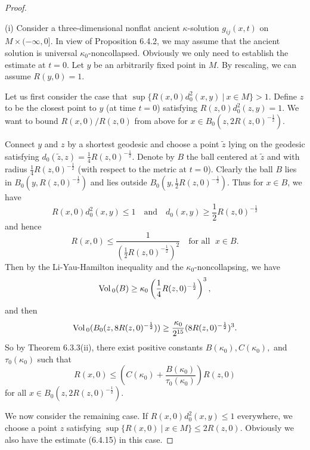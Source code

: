 \begin{proof}
   \

(i) Consider a three-dimensional nonflat ancient $\kappa$-solution
$g_{ij}(x,t)$ on $M \times (-\infty,0]$. In view of Proposition
6.4.2, we may assume that the ancient solution is universal
$\kappa_0$-noncollapsed. Obviously we only need to establish the
estimate at $t=0$. Let $y$ be an arbitrarily fixed point in $M$.
By rescaling, we can assume $R(y,0)=1$.

Let us first consider the case that $\sup\{R(x,0)d_0^2(x,y)\ |\
x\in M\}>1$. Define $z$ to be the closest point to $y$ (at time
$t=0$) satisfying $R(z,0)d_0^2(z,y)=1$. We want to bound
$R(x,0)/R(z,0)$ from above for $x\in
B_0(z,2R(z,0)^{-\frac{1}{2}}).$

Connect $y$ and $z$ by a shortest geodesic and choose a point
$\tilde{z}$ lying on the geodesic satisfying
$d_0(\tilde{z},z)=\frac{1}{4}R(z,0)^{-\frac{1}{2}}$. Denote by $B$
the ball centered at $\tilde{z}$ and with radius
$\frac{1}{4}R(z,0)^{-\frac{1}{2}}$ (with respect to the metric at
$t=0$). Clearly the ball $B$ lies in
$B_0(y,R(z,0)^{-\frac{1}{2}})$ and lies outside
$B_0(y,\frac{1}{2}R(z,0)^{-\frac{1}{2}})$. Thus for $x\in B$, we
have
$$
R(x,0)d_0^2(x,y)\le 1\quad \mbox{and} \quad
d_0(x,y)\ge\frac{1}{2}R(z,0)^{-\frac{1}{2}}
$$
and hence
$$
R(x,0)\le\frac{1}{(\frac{1}{2}R(z,0)^{-\frac{1}{2}})^2} \quad
\mbox{for all } \;x\in B.
$$
Then by the Li-Yau-Hamilton inequality and the
$\kappa_0$-noncollapsing, we have
$$
{\rm Vol}\,_0(B)\ge\kappa_0\left(\frac{1}{4}R(z,0)^{-\frac{1}{2}}\right)^3,
$$
and then
$$
{\rm Vol}\,_0(B_0(z,8R(z,0)^{-\frac{1}{2}}))
\ge\frac{\kappa_0}{2^{15}}(8R(z,0)^{-\frac{1}{2}})^3.
$$
So by Theorem 6.3.3(ii), there exist positive constants
$B(\kappa_0), C(\kappa_0),$ and $\tau_0(\kappa_0)$ such that \begin{equation}
R(x,0)\le (C(\kappa_0)+\frac{B(\kappa_0)}{\tau_0(\kappa_0)})R(z,0)
\end{equation} for all $x\in B_0(z,2R(z,0)^{-\frac{1}{2}})$.

We now consider the remaining case. If $R(x,0)d_0^2(x,y)\le 1$
everywhere, we choose a point $z$ satisfying $\sup\{R(x,0)\ |\
x\in M\}\leq2R(z,0)$. Obviously we also have the estimate (6.4.15)
in this case.


\end{proof}
